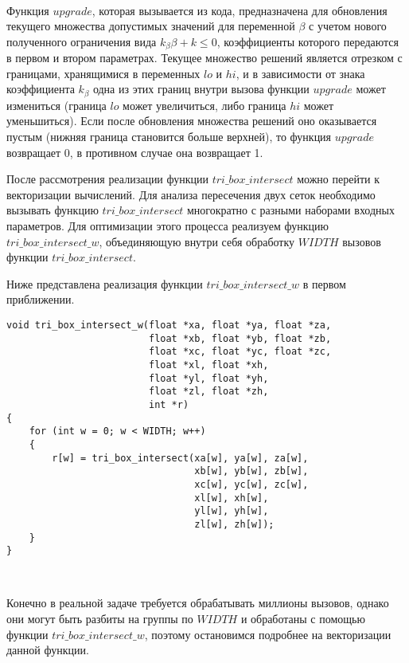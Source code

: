 \documentclass[
11pt,%
tightenlines,%
twoside,%
onecolumn,%
nofloats,%
nobibnotes,%
nofootinbib,%
superscriptaddress,%
noshowpacs,%
centertags]%
{revtex4}
\begin{document}
\ \\
 
Функция $upgrade$, которая вызывается из кода, предназначена для обновления текущего множества допустимых значений для переменной $\beta$ с учетом нового полученного ограничения вида $k_{\beta}\beta + k \le 0$, коэффициенты которого передаются в первом и втором параметрах.
Текущее множество решений является отрезком с границами, хранящимися в переменных $lo$ и $hi$, и в зависимости от знака коэффициента $k_{\beta}$ одна из этих границ внутри вызова функции $upgrade$ может измениться (граница $lo$ может увеличиться, либо граница $hi$ может уменьшиться).
Если после обновления множества решений оно оказывается пустым (нижняя граница становится больше верхней), то функция $upgrade$ возвращает 0, в противном случае она возвращает 1.

После рассмотрения реализации функции $tri\_box\_intersect$ можно перейти к векторизации вычислений.
Для анализа пересечения двух сеток необходимо вызывать функцию $tri\_box\_intersect$ многократно с разными наборами входных параметров.
Для оптимизации этого процесса реализуем функцию $tri\_box\_intersect\_w$, объединяющую внутри себя обработку $WIDTH$ вызовов функции $tri\_box\_intersect$.

Ниже представлена реализация функции $tri\_box\_intersect\_w$ в первом приближении.

\begin{lstlisting}[caption={Исходная реализация функции, объединяющей $WIDTH$ вызовов функции $tri\_box\_intersect$.},label={lst:prac_intersect_w}]
void tri_box_intersect_w(float *xa, float *ya, float *za,
                         float *xb, float *yb, float *zb,
                         float *xc, float *yc, float *zc,
                         float *xl, float *xh,
                         float *yl, float *yh,
                         float *zl, float *zh,
                         int *r)
{
    for (int w = 0; w < WIDTH; w++)
    {
        r[w] = tri_box_intersect(xa[w], ya[w], za[w],
                                 xb[w], yb[w], zb[w],
                                 xc[w], yc[w], zc[w],
                                 xl[w], xh[w],
                                 yl[w], yh[w],
                                 zl[w], zh[w]);
    }
}
\end{lstlisting}

\

Конечно в реальной задаче требуется обрабатывать миллионы вызовов, однако они могут быть разбиты на группы по $WIDTH$ и обработаны с помощью функции $tri\_box\_intersect\_w$, поэтому остановимся подробнее на векторизации данной функции. 
 
\end{document}
